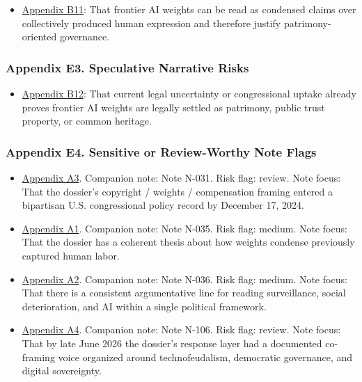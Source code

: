 \documentclass[
  american,
  11pt,
  letterpaper,
]{article}
\providecommand{\tightlist}{%
  \setlength{\itemsep}{0pt}\setlength{\parskip}{0pt}}
\begin{document}
\begin{itemize}
\tightlist
\item
  \hyperref[ch-00-appendix-b11-frontier-ai-weights-can-be-read-as-condensed-claims-over-collectively-produced-hu]{Appendix
  B11}: That frontier AI weights can be read as condensed claims over
  collectively produced human expression and therefore justify
  patrimony-oriented governance.
\end{itemize}

\subsubsection{Appendix E3. Speculative Narrative
Risks}\label{ch-00-appendix-e3-speculative-narrative-risks}

\begin{itemize}
\tightlist
\item
  \hyperref[ch-00-appendix-b12-current-legal-uncertainty-or-congressional-uptake-already-proves-frontier-ai-weig]{Appendix
  B12}: That current legal uncertainty or congressional uptake already
  proves frontier AI weights are legally settled as patrimony, public
  trust property, or common heritage.
\end{itemize}

\subsubsection{Appendix E4. Sensitive or Review-Worthy Note
Flags}\label{ch-00-appendix-e4-sensitive-or-review-worthy-note-flags}

\begin{itemize}
\tightlist
\item
  \hyperref[ch-00-appendix-a3-bipartisan-house-task-force-report-on-artificial-intelligence]{Appendix
  A3}. Companion note: Note N-031. Risk flag: review. Note focus: That
  the dossier's copyright / weights / compensation framing entered a
  bipartisan U.S. congressional policy record by December 17, 2024.
\item
  \hyperref[ch-00-appendix-a1-ai-copyright-weights-a-new-frontier-in-intellectual-property-law]{Appendix
  A1}. Companion note: Note N-035. Risk flag: medium. Note focus: That
  the dossier has a coherent thesis about how weights condense
  previously captured human labor.
\item
  \hyperref[ch-00-appendix-a2-how-ai-is-ruining-your-life-to-build-an-empire]{Appendix
  A2}. Companion note: Note N-036. Risk flag: medium. Note focus: That
  there is a consistent argumentative line for reading surveillance,
  social deterioration, and AI within a single political framework.
\item
  \hyperref[ch-00-appendix-a4-c-mo-hackear-al-tecnofeudalismo]{Appendix
  A4}. Companion note: Note N-106. Risk flag: review. Note focus: That
  by late June 2026 the dossier's response layer had a documented
  co-framing voice organized around technofeudalism, democratic
  governance, and digital sovereignty.
\end{itemize}
\end{document}
